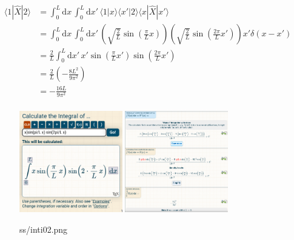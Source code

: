 \documentclass[letter]{article}
\begin{document}
\begin{align*}
	\langle 1 | \hat{X} | 2 \rangle &= 
\int_{0}^{L} \mathrm{d} x \, 
\int_{0}^{L} \mathrm{d} x' \, 
\langle 1 | x \rangle \langle x' |  2 \rangle \langle x | \hat{X} | x' \rangle 
	\\
	&= 
\int_{0}^{L} \mathrm{d} x \, 
\int_{0}^{L} \mathrm{d} x' \, 
\left(\sqrt{\frac{2}{L}} \sin\left(\frac{\pi}{L}x\right)  \right)
\left(\sqrt{\frac{2}{L}}  \sin\left(\frac{2 \pi }{L} x' \right)\right) 
x' \delta(x- x')
	\\
	&= \frac{2}{L}
\int_{0}^{L} \mathrm{d} x' \, x' \sin\left(\frac{\pi}{L}x'\right) \sin\left(\frac{2\pi }{L}x' \right) 
	\\
	&= \frac{2}{L} \left(- \frac{8L^2}{9 \pi^2}\right) \\
	&= -\frac{16 L}{9 \pi^2} \\
\end{align*}
\begin{figure}[H]
	\centering
	\includegraphics[width=0.4\textwidth]{ss/inti01.png}
	\includegraphics[width=0.4\textwidth]{ss/inti02.png}
	\caption{ss/inti02.png}
	\label{fig:ss-inti02-png}
\end{figure}
\end{document}
